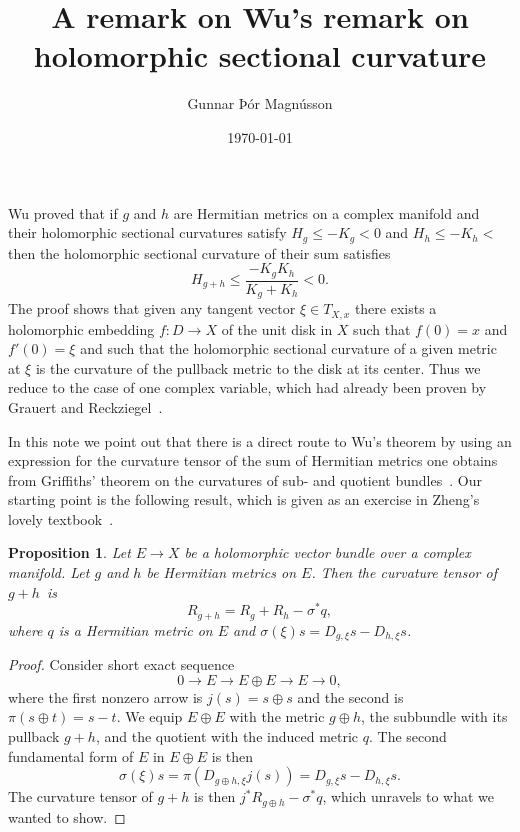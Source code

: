 \documentclass[10pt,a4paper]{amsart}
\author{Gunnar Þór Magnússon}
\date{\today}
\title{A remark on Wu's remark on\\holomorphic sectional curvature}
\newtheorem{prop}[theo]{Proposition}
\begin{document}
\maketitle


Wu \cite{wu1973remark} proved that if $g$ and $h$ are Hermitian metrics on a
complex manifold and their holomorphic sectional curvatures satisfy $H_g \leq
-K_g < 0$ and $H_h \leq -K_h < $ then the holomorphic sectional curvature of
their sum satisfies
\[
H_{g + h} \leq \frac{-K_g K_h}{K_g + K_h} < 0.
\]
The proof shows
that given any tangent vector $\xi \in T_{X,x}$ there
exists a holomorphic embedding $f : D \to X$ of the unit disk in $X$ such that
$f(0) = x$ and $f'(0) = \xi$ and such that the holomorphic sectional curvature
of a given metric at $\xi$ is the curvature of the pullback metric
to the disk at its center.
Thus we reduce to the case of one complex variable,
which had already been proven by Grauert and
Reckziegel~\cite{grauert1965hermitesche}.

In this note we point out that there is a direct route to Wu's theorem by using
an expression for the curvature tensor of the sum of Hermitian metrics one
obtains from Griffiths' theorem on the curvatures of sub- and quotient
bundles~\cite{griffiths1965hermitian}. Our starting point is the following
result, which is given as an exercise in Zheng's lovely
textbook~\cite{zheng2000complex}.


\begin{prop}
Let $E \to X$ be a holomorphic vector bundle over a complex manifold.
Let $g$ and $h$ be Hermitian metrics on $E$.
Then the curvature tensor of $g + h$~is%
\[
R_{g + h} = R_g + R_h - \sigma^*q,
\]
where $q$ is a Hermitian metric on $E$ and $\sigma(\xi)s = D_{g,\xi} s -
D_{h,\xi} s$.
\end{prop}


\begin{proof}
Consider short exact sequence
\[
0 \longrightarrow
E \longrightarrow
E \oplus E \longrightarrow
E \longrightarrow
0,
\]
where the first nonzero arrow is $j(s) = s \oplus s$ and the second is $\pi(s
\oplus t) = s - t$.
We equip $E \oplus E$ with the metric $g \oplus h$, the subbundle with its
pullback $g + h$, and the quotient with the induced metric $q$.
The second fundamental form of $E$ in $E \oplus E$ is then
\[
\sigma(\xi) s
= \pi(D_{g \oplus h, \xi} j(s))
= D_{g,\xi}s - D_{h,\xi} s.
\]
The curvature tensor of $g + h$ is then $j^*R_{g \oplus h} - \sigma^* q$, which
unravels to what we wanted to show.
\end{proof}
\end{document}
